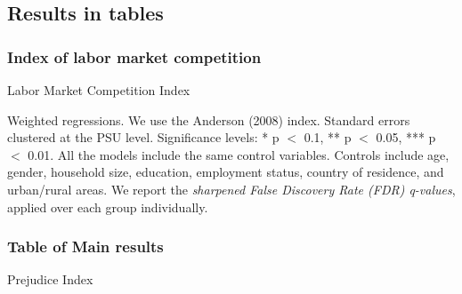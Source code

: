 \documentclass[a4paper,12pt]{article}
\renewcommand{\footnotesize}{\fontsize{8pt}{9pt}\selectfont}
\begin{document}
\begin{appendix}
\vspace{10mm}

\subsection{Results in tables}\label{annex:mainresults}

\subsubsection{Index of labor market competition}\label{annex:lm_comp_ind}

\begin{table}[H]
	\footnotesize
	\caption{Labor Market Competition Index}
	\label{tab:main_lmcomp} 
	\centering
	\begin{threeparttable}
		
	\begin{tablenotes}
		\footnotesize
		\item Weighted regressions. We use the Anderson (2008) index. Standard errors clustered at the PSU level. Significance levels: * p $<$ 0.1, ** p $<$ 0.05, *** p $<$ 0.01. All the models include the same control variables. Controls include age, gender, household size, education, employment status, country of residence, and urban/rural areas. We report the \cite{anderson2008multiple} \textit{sharpened False Discovery Rate (FDR) q-values}, applied over each group individually.
	\end{tablenotes}
	\end{threeparttable}
\end{table} 

\vspace{5mm}

\subsubsection{Table of Main results}\label{annex:main_results_agg}

\begin{table}[H]
	\footnotesize
	\caption{Prejudice Index}
	\label{tab:main_pooled}
	\centering
	\begin{threeparttable}



\end{threeparttable}
\end{table}
\end{appendix}
\end{document}
